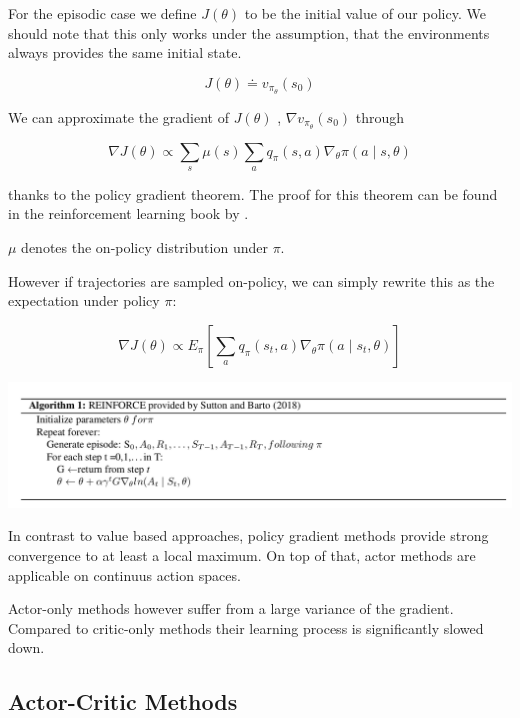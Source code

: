 For the episodic case we define $J(\theta)$ to be the initial value of our policy. We should note that this only works under the assumption, that the environments always provides the same initial state.

\begin{equation}
J(\theta) \doteq v_{\pi_\theta}(s_0)
\end{equation}

We can approximate the gradient of $J(\theta)$ , $ \nabla v_{\pi_\theta}(s_0)$ through

\begin{equation}
\nabla J(\theta) \propto \sum_s \mu (s) \sum_a q_\pi (s,a) \nabla_\theta \pi(a \mid s, \theta)
\end{equation}

thanks to the policy gradient theorem. The proof for this theorem can be found in the reinforcement learning book by \citet{Sut98}.

$\mu$ denotes the on-policy distribution under $\pi$.

However if trajectories are sampled on-policy, we can simply rewrite this as the expectation under policy $\pi$:

\begin{equation}
\nabla J(\theta) \propto E_\pi \left[ \sum_a q_\pi (s_t,a) \nabla_\theta \pi (a \mid s_t, \theta) \right]
\end{equation}




\includegraphics[scale=0.4]{bilder/REINFORCE.png}


In contrast to value based approaches, policy gradient methods provide strong convergence to at least a local maximum.
On top of that, actor methods are applicable on continuus action spaces.
 \citep{Sutton00policygradient}
 
Actor-only methods however suffer from a large variance of the gradient. Compared to critic-only methods their learning process is significantly slowed down. \citep{Grondman12}
 

\subsection{Actor-Critic Methods}

